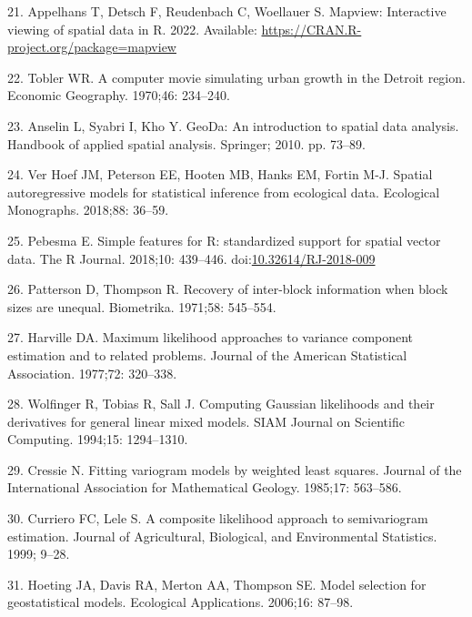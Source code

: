 \documentclass[10pt,letterpaper]{article}
\begin{document}
\leavevmode\hypertarget{ref-appelhans2022mapview}{}%
21. Appelhans T, Detsch F, Reudenbach C, Woellauer S. Mapview:
Interactive viewing of spatial data in R. 2022. Available:
\url{https://CRAN.R-project.org/package=mapview}

\leavevmode\hypertarget{ref-tobler1970computer}{}%
22. Tobler WR. A computer movie simulating urban growth in the Detroit
region. Economic Geography. 1970;46: 234--240.

\leavevmode\hypertarget{ref-anselin2010geoda}{}%
23. Anselin L, Syabri I, Kho Y. GeoDa: An introduction to spatial data
analysis. Handbook of applied spatial analysis. Springer; 2010. pp.
73--89.

\leavevmode\hypertarget{ref-ver2018spatial}{}%
24. Ver Hoef JM, Peterson EE, Hooten MB, Hanks EM, Fortin M-J. Spatial
autoregressive models for statistical inference from ecological data.
Ecological Monographs. 2018;88: 36--59.

\leavevmode\hypertarget{ref-pebesma2018sf}{}%
25. Pebesma E. Simple features for R: standardized support for spatial
vector data. The R Journal. 2018;10: 439--446.
doi:\href{https://doi.org/10.32614/RJ-2018-009}{10.32614/RJ-2018-009}

\leavevmode\hypertarget{ref-patterson1971recovery}{}%
26. Patterson D, Thompson R. Recovery of inter-block information when
block sizes are unequal. Biometrika. 1971;58: 545--554.

\leavevmode\hypertarget{ref-harville1977maximum}{}%
27. Harville DA. Maximum likelihood approaches to variance component
estimation and to related problems. Journal of the American Statistical
Association. 1977;72: 320--338.

\leavevmode\hypertarget{ref-wolfinger1994computing}{}%
28. Wolfinger R, Tobias R, Sall J. Computing Gaussian likelihoods and
their derivatives for general linear mixed models. SIAM Journal on
Scientific Computing. 1994;15: 1294--1310.

\leavevmode\hypertarget{ref-cressie1985fitting}{}%
29. Cressie N. Fitting variogram models by weighted least squares.
Journal of the International Association for Mathematical Geology.
1985;17: 563--586.

\leavevmode\hypertarget{ref-curriero1999composite}{}%
30. Curriero FC, Lele S. A composite likelihood approach to
semivariogram estimation. Journal of Agricultural, Biological, and
Environmental Statistics. 1999; 9--28.

\leavevmode\hypertarget{ref-hoeting2006model}{}%
31. Hoeting JA, Davis RA, Merton AA, Thompson SE. Model selection for
geostatistical models. Ecological Applications. 2006;16: 87--98.
\end{document}
